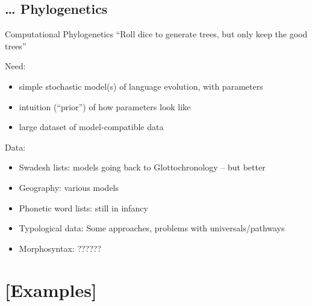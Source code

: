 \documentclass[9pt]{beamer}
\begin{document}
\subsection{… Phylogenetics}
\begin{frame}{Computational Phylogenetics}
  “Roll dice to generate trees, but only keep the good trees”

  \pause
  Need:
  \begin{itemize}
  \item simple stochastic model(s) of language evolution, with parameters
  \item intuition (“prior”) of how parameters look like
  \item large dataset of model-compatible data
  \end{itemize}

  \pause
  Data:
  \begin{itemize}
  \item Swadesh lists: models going back to Glottochronology – but better
  \item Geography: various models
  \item Phonetic word lists: still in infancy
  \item Typological data: Some approaches, problems with universals/pathways
  \item Morphosyntax: ??????
  \end{itemize}
\end{frame}
\section{[Examples]}
\end{document}
